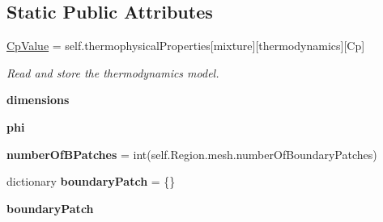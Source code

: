 \subsection*{Static Public Attributes}
\begin{DoxyCompactItemize}
\item 
\mbox{\label{classpy_f_v_m_1_1_foam_dictionaries_1_1_foam_dictionaries_a2caa15598d601e104b55bc043ccbab93}} 
\mbox{\hyperlink{classpy_f_v_m_1_1_foam_dictionaries_1_1_foam_dictionaries_a2caa15598d601e104b55bc043ccbab93}{Cp\+Value}} = self.\+thermophysical\+Properties\mbox{[}\textquotesingle{}mixture\textquotesingle{}\mbox{]}\mbox{[}\textquotesingle{}thermodynamics\textquotesingle{}\mbox{]}\mbox{[}\textquotesingle{}Cp\textquotesingle{}\mbox{]}
\begin{DoxyCompactList}\small\item\em Read and store the thermodynamics model. \end{DoxyCompactList}\item 
\mbox{\label{classpy_f_v_m_1_1_foam_dictionaries_1_1_foam_dictionaries_a3e76c2a98f3633410482daf6cc068d46}} 
{\bfseries dimensions}
\item 
\mbox{\label{classpy_f_v_m_1_1_foam_dictionaries_1_1_foam_dictionaries_a2a5ab6cd1762ed2bdbfbd4ecd9c8c06c}} 
{\bfseries phi}
\item 
\mbox{\label{classpy_f_v_m_1_1_foam_dictionaries_1_1_foam_dictionaries_a2c0919be7890e7aa8885f316880392ec}} 
{\bfseries number\+Of\+B\+Patches} = int(self.\+Region.\+mesh.\+number\+Of\+Boundary\+Patches)
\item 
\mbox{\label{classpy_f_v_m_1_1_foam_dictionaries_1_1_foam_dictionaries_a9e78892010ec2bf14d44f8aa05a62548}} 
dictionary {\bfseries boundary\+Patch} = \{\}
\item 
\mbox{\label{classpy_f_v_m_1_1_foam_dictionaries_1_1_foam_dictionaries_a91e458f6dcf94775e1b212e83747b959}} 
{\bfseries boundary\+Patch}
\item 

\end{DoxyCompactItemize}
